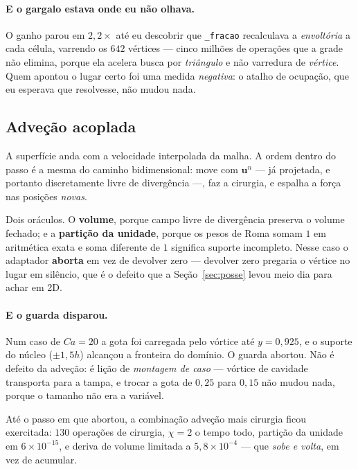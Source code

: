\paragraph{E o gargalo estava onde eu n\~ao olhava.} O ganho parou em
$2{,}2\times$ at\'e eu descobrir que \texttt{\_fracao} recalculava a
\emph{envolt\'oria} a cada c\'elula, varrendo os $642$ v\'ertices --- cinco
milh\~oes de opera\c{c}\~oes que a grade n\~ao elimina, porque ela acelera busca
por \emph{tri\^angulo} e n\~ao varredura de \emph{v\'ertice}. Quem apontou o
lugar certo foi uma medida \emph{negativa}: o atalho de ocupa\c{c}\~ao, que eu
esperava que resolvesse, n\~ao mudou nada.

\subsection{Adve\c{c}\~ao acoplada}

A superf\'icie anda com a velocidade interpolada da malha. A ordem dentro do
passo \'e a mesma do caminho bidimensional: move com $\mathbf{u}^n$ --- j\'a
projetada, e portanto discretamente livre de diverg\^encia ---, faz a cirurgia, e
espalha a for\c{c}a nas posi\c{c}\~oes \emph{novas}.

Dois or\'aculos. O \textbf{volume}, porque campo livre de diverg\^encia preserva
o volume fechado; e a \textbf{parti\c{c}\~ao da unidade}, porque os pesos de Roma
somam $1$ em aritm\'etica exata e soma diferente de $1$ significa suporte
incompleto. Nesse caso o adaptador \textbf{aborta} em vez de devolver zero ---
devolver zero pregaria o v\'ertice no lugar em sil\^encio, que \'e o defeito que
a Se\c{c}\~ao~\ref{sec:posse} levou meio dia para achar em 2D.

\paragraph{E o guarda disparou.} Num caso de $Ca=20$ a gota foi carregada pelo
v\'ortice at\'e $y=0{,}925$, e o suporte do n\'ucleo ($\pm 1{,}5h$) alcan\c{c}ou
a fronteira do dom\'inio. O guarda abortou. N\~ao \'e defeito da adve\c{c}\~ao:
\'e li\c{c}\~ao de \emph{montagem de caso} --- v\'ortice de cavidade transporta
para a tampa, e trocar a gota de $0{,}25$ para $0{,}15$ n\~ao mudou nada, porque
o tamanho n\~ao era a vari\'avel.

At\'e o passo em que abortou, a combina\c{c}\~ao adve\c{c}\~ao mais cirurgia
ficou exercitada: $130$ opera\c{c}\~oes de cirurgia, $\chi=2$ o tempo todo,
parti\c{c}\~ao da unidade em $6\times10^{-15}$, e deriva de volume limitada a
$5{,}8\times10^{-4}$ --- que \emph{sobe e volta}, em vez de acumular.

